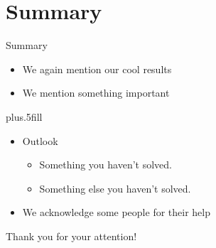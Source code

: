\section*{Summary}
  \begin{frame}{Summary}
    \begin{itemize}
    \item[\cmark] We again mention our cool results
    \item We mention something important
    \end{itemize}
    
    \vskip0pt plus.5fill
    \begin{itemize}
    \item
      Outlook
      \begin{itemize}
      \item[\xmark]
        Something you haven't solved.
      \item
        Something else you haven't solved.
      \end{itemize}
    \item[\ding{43}] We acknowledge some people for their help
    \end{itemize}
  \end{frame}



  \begin{frame}
    \begin{center}
      \begin{minipage}{0.7\textwidth}
        \begin{block}{}
          \centering
          \vspace{3mm}
          \Large \alert{Thank you for your attention!}
          \vspace{3mm}
        \end{block}
      \end{minipage}
    \end{center}
  \end{frame}

      



















